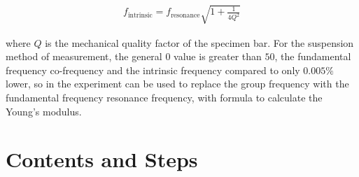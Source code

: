 \documentclass[UTF8]{article}
\begin{document}
    \begin{eqnarray}
    f_{\text {intrinsic}}=f_{\text {resonance}} \sqrt{1+\frac{1}{4 Q^{2}}}
    \end{eqnarray}
    
    where $Q$ is the mechanical quality factor of the specimen bar. For the suspension method of measurement, the general $0$ value is greater than $50$, the fundamental frequency co-frequency and the intrinsic frequency compared to only $0.005\%$ lower, so in the experiment can be used to replace the group frequency with the fundamental frequency resonance frequency, with formula to calculate the Young's modulus.
   
      
               
	\section{Contents and Steps}
\end{document}
